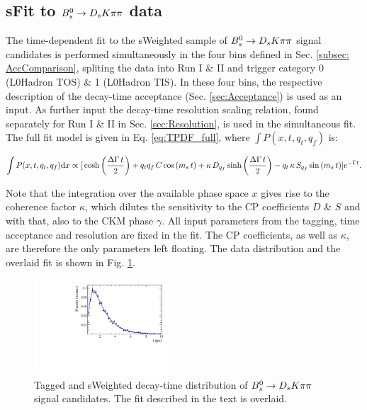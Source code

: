 \clearpage
\subsection{sFit to ${{B}^0_{s}}\rightarrow{\ensuremath{{D}_{s}}}{\ensuremath{K}}{\ensuremath{\pi}}{\ensuremath{\pi}}$ data}
The time-dependent fit to the sWeighted sample of ${{B}^0_{s}}\rightarrow{\ensuremath{{D}_{s}}}{\ensuremath{K}}{\ensuremath{\pi}}{\ensuremath{\pi}}$ signal candidates is performed simultaneously in the four bins defined in Sec. \ref{subsec: AccComparison}, 
spliting the data into Run I \& II and trigger category 0 (L0Hadron TOS) \& 1 (L0Hadron TIS). 
In these four bins, the respective description of the decay-time acceptance (Sec. \ref{sec:Acceptance}) is used as an input. 
As further input the decay-time resolution scaling relation, found separately for Run I \& II in Sec. \ref{sec:Resolution}, is used in the simultaneous fit. 
The full fit model is given in Eq. \ref{eq:TPDF_full}, where $\int P(x,t,q_t,q_f)$ is: 

\begin{equation} 
           \int P(x,t,q_t,q_f) \text d x \propto    [
        \, \text{cosh} \left( \frac{\Delta \Gamma \, t}{2}\right) 
          + q_t q_f \, C \, \text{cos} \left( m_s \, t \right)  
          + \kappa \, D_{q_f} \, \text{sinh} \left( \frac{\Delta \Gamma \, t}{2}\right)  
          - q_t \, \kappa \, S_{q_f}\, \text{sin} \left( m_s \, t \right)  ]  e^{- \Gamma t}.
\end{equation}

Note that the integration over the available phase space $x$ gives rise to the coherence factor $\kappa$, which dilutes the sensitivity to the CP coefficients $D$ \& $S$ and with that, also to the CKM phase $\gamma$. 
All input parameters from the tagging, time acceptance and resolution are fixed in the fit. The CP coefficients, as well as $\kappa$, are therefore the only parameters left floating. 
The data distribution and the overlaid fit is shown in Fig. \ref{fig:tFitSig}.

\begin{figure}[h]
	\centering
		\includegraphics[width=0.45\textwidth, height = !]{figs/timeFit/signal/h_t.pdf} 
		\caption{Tagged and sWeighted decay-time distribution of ${{B}^0_{s}}\rightarrow{\ensuremath{{D}_{s}}}{\ensuremath{K}}{\ensuremath{\pi}}{\ensuremath{\pi}}$ signal candidates. The fit described in the text is overlaid.} 
		\label{fig:tFitSig}
\end{figure}	

